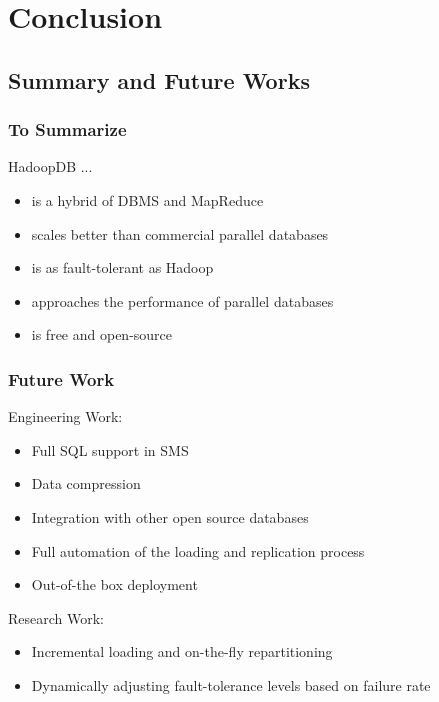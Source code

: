 \documentclass{beamer}
\begin{document}
\section{Conclusion}
\label{sec:conclusion}

\subsection{Summary and Future Works}
\begin{frame}
  \frametitle{To Summarize}
  \begin{block}{HadoopDB ...}
    \begin{itemize}
    \item is a hybrid of DBMS and MapReduce
    \item scales better than commercial parallel databases
    \item is as fault-tolerant as Hadoop
    \item approaches the performance of parallel databases
    \item is free and open-source
    \end{itemize}
  \end{block}
\end{frame}


\begin{frame}
  \frametitle{Future Work}
  Engineering Work:
  \begin{itemize}
  \item Full SQL support in SMS 
  \item Data compression
  \item Integration with other open source databases
  \item Full automation of the loading and replication process
  \item Out-of-the box deployment
  \end{itemize}
  Research Work:
  \begin{itemize}
  \item Incremental loading and on-the-fly repartitioning
  \item Dynamically adjusting fault-tolerance levels based on failure
    rate
  \end{itemize}

\end{frame}



\end{document}

